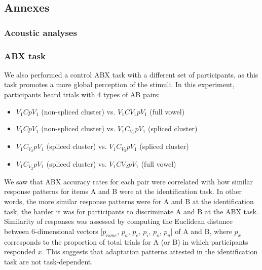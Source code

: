 \subsection{Annexes}

\subsubsection{Acoustic analyses}

\subsubsection{ABX task}

We also performed a control ABX task with a different set of participants, as this task promotes a more global perception of the stimuli. In this experiment, participants heard trials with 4 types of AB pairs:
\begin{itemize}
    \item $V_1CpV_1$ (non-spliced cluster) vs. $V_1CV_1pV_1$ (full vowel)
    \item $V_1CpV_1$ (non-spliced cluster) vs. $V_1C_{V_2}pV_1$ (spliced cluster)
    \item $V_1C_{V_2}pV_1$ (spliced cluster) vs. $V_1C_{V_3}pV_1$ (spliced cluster)
    \item $V_1C_{V_2}pV_1$ (spliced cluster) vs. $V_1CV_2pV_1$ (full vowel)
\end{itemize}

We saw that ABX accuracy rates for each pair were correlated with how similar response patterns for items A and B were at the identification task. In other words, the more similar response patterns were for A and B at the identification task, the harder it was for participants to discriminate A and B at the ABX task. \\

Similarity of responses was assessed by computing the Euclidean distance between 6-dimensional vectors [$p_{none}$, $p_a$, $p_e$, $p_i$, $p_o$, $p_u$] of A and B, where $p_x$ corresponds to the proportion of total trials for A (or B) in which participants responded $x$. This suggests that adaptation patterns attested in the identification task are not task-dependent.
\\


